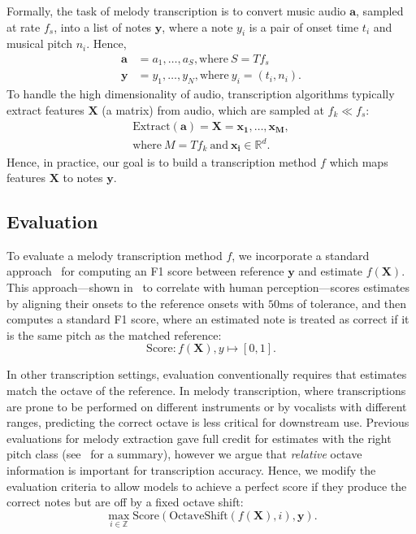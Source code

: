 \documentclass{article}
\newcommand{\fone}{F1}
\begin{document}
Formally, the task of melody transcription is to convert music audio $\bm{a}$, sampled at rate $f_s$, into a list of notes $\bm{y}$, where a note $y_i$ is a pair of onset time $t_i$ and musical pitch $n_i$. Hence, 
\begin{align*}
    \bm{a} &= a_1, \ldots, a_S, \text{where}~S = Tf_s \\
    \bm{y} &= y_1, \ldots, y_N, \text{where}~y_i = (t_i, n_i).
\end{align*}
To handle the high dimensionality of audio, transcription algorithms typically extract features $\bm{X}$ (a matrix) from audio, which are sampled at $f_k \ll f_s$:
\begin{align*}
    \text{Extract}(\bm{a}) = \bm{X} = \bm{x_1}, \ldots, \bm{x_M}, \\ 
    \text{where}~M = Tf_k~\text{and}~\bm{x_i} \in \mathbb{R}^d.
\end{align*}
Hence, in practice, our goal is to build a transcription method $f$ which maps features $\bm{X}$ to notes $\bm{y}$. 

\subsection{Evaluation}

To evaluate a melody transcription method $f$, 
we incorporate a standard approach~\cite{raffel2014eval} for computing an \fone{} score between reference $\bm{y}$ and estimate $f(\bm{X})$. 
This approach---shown in~\cite{ycart2020investigating} to correlate with human perception---scores estimates by aligning their onsets to the reference onsets with $50$ms of tolerance, and then computes a standard \fone{} score, where an estimated note is treated as correct if it is the same pitch as the matched reference:
\begin{equation*}
    \text{Score} : f(\bm{X}), y \mapsto [0, 1].
\end{equation*}

In other transcription settings, evaluation conventionally requires that estimates match the octave of the reference. 
In melody transcription, where transcriptions are prone to be performed on different instruments or by vocalists with different ranges, predicting the correct octave is less critical for downstream use. 
Previous evaluations for melody extraction gave full credit for estimates with the right pitch class (see~\cite{poliner2007melody} for a summary), however we argue that \emph{relative} octave information is important for transcription accuracy. 
Hence, we modify the evaluation criteria to allow models to achieve a perfect score if they produce the correct notes but are off by a fixed octave shift:
\begin{equation*}
    \max_{i \in \mathbb{Z}} \text{Score}(\text{OctaveShift}(f(\bm{X}), i), \mathbf{y}).
\end{equation*}
\end{document}
